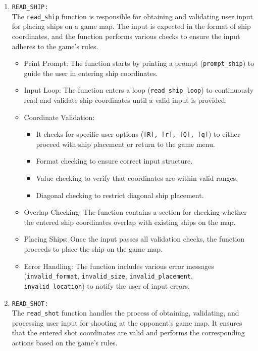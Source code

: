 \begin{enumerate}
    \item \large{\texttt{READ\_SHIP:}} \\[6pt]
    \qquad The \texttt{read\_ship} function is responsible for obtaining and validating user input for placing ships on a game map. The input is expected in the format of ship coordinates, and the function performs various checks to ensure the input adheres to the game's rules.
    \begin{itemize}
        \item Print Prompt: The function starts by printing a prompt (\texttt{prompt\_ship}) to guide the user in entering ship coordinates.
        \item Input Loop: The function enters a loop (\texttt{read\_ship\_loop}) to continuously read and validate ship coordinates until a valid input is provided.
        \item Coordinate Validation:
        \begin{itemize}
            \item It checks for specific user options (\texttt{[R], [r], [Q], [q]}) to either proceed with ship placement or return to the game menu.
            \item Format checking to ensure correct input structure.
            \item Value checking to verify that coordinates are within valid ranges.
            \item Diagonal checking to restrict diagonal ship placement.
        \end{itemize}
        \item Overlap Checking: The function contains a section for checking whether the entered ship coordinates overlap with existing ships on the map.
        \item Placing Ships: Once the input passes all validation checks, the function proceeds to place the ship on the game map.
        \item Error Handling: The function includes various error messages (\texttt{invalid\_format}, \texttt{invalid\_size}, \texttt{invalid\_placement}, \texttt{invalid\_location}) to notify the user of input errors. \\
    \end{itemize}

    \item \large{\texttt{READ\_SHOT:}} \\[6pt]
    \qquad The \texttt{read\_shot} function handles the process of obtaining, validating, and processing user input for shooting at the opponent's game map. It ensures that the entered shot coordinates are valid and performs the corresponding actions based on the game's rules.


\end{enumerate}
